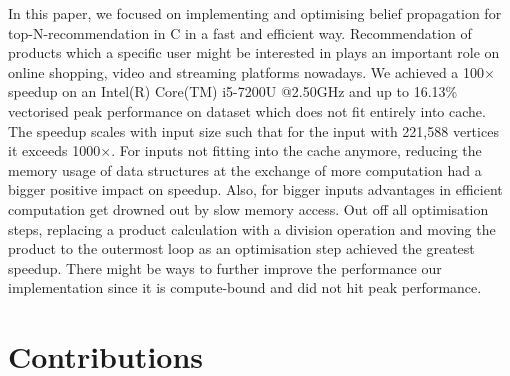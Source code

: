 \documentclass[letterpaper]{article}
\begin{document}
In this paper, we focused on implementing and optimising belief propagation for top-N-recommendation in C in a fast and efficient way.
Recommendation of products which a specific user might be interested in plays an important role on online shopping, video and streaming platforms nowadays. 
We achieved a 100$\times$ speedup on an Intel(R) Core(TM) i5-7200U @2.50GHz and up to 16.13\% vectorised peak performance on dataset which does not fit entirely into cache.
The speedup scales with input size such that for the input with 221,588 vertices it exceeds 1000$\times$.
For inputs not fitting into the cache anymore, reducing the memory usage of data structures at the exchange of more computation had a bigger positive impact on speedup.
Also, for bigger inputs advantages in efficient computation get drowned out by slow memory access.
Out off all optimisation steps, replacing a product calculation with a division operation and moving the product to the outermost loop as an optimisation step achieved the greatest speedup.\sr{*}
There might be ways to further improve the performance our implementation since it is compute-bound and did not hit peak performance.\sr{*}


\section{Contributions}%


\end{document}
